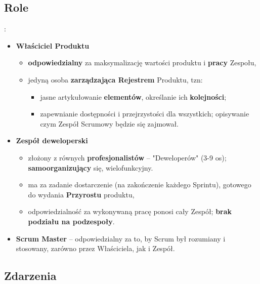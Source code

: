 \documentclass[main.tex]{subfiles}
\begin{document}
    \subsection{Role}:
    \begin{itemize}
        \item \textbf{Właściciel Produktu}
        \begin{itemize}[noitemsep]
            \item \textbf{odpowiedzialny} za maksymalizację wartości produktu i \textbf{pracy} Zespołu,
            \item jedyną osoba \textbf{zarządzająca Rejestrem} Produktu, tzn:
            \begin{itemize}[noitemsep]
                \item jasne artykułowanie \textbf{elementów}, określanie ich \textbf{kolejności};
                \item zapewnianie dostępności i przejrzystości dla wszystkich; opisywanie czym
                Zespół Scrumowy będzie się zajmował.
            \end{itemize}
        \end{itemize}

        \item \textbf{Zespół deweloperski}
        \begin{itemize}[noitemsep]
            \item złożony z równych \textbf{profesjonalistów} -- "Deweloperów" (3-9 os); \textbf{samoorganizujący} się, wielofunkcyjny.
            \item ma za zadanie dostarczenie (na zakończenie każdego Sprintu), gotowego do wydania \textbf{Przyrostu}
            produktu,
            \item odpowiedzialność za wykonywaną pracę ponosi cały Zespół; \textbf{brak podziału na podzespoły}.
        \end{itemize}

        \item \textbf{Scrum Master} -- odpowiedzialny za to, by Scrum był rozumiany i stosowany, zarówno przez Właściciela,
        jak i Zespół.
    \end{itemize}

    \subsection{Zdarzenia}
\end{document}
